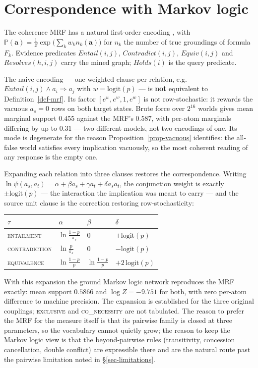 \documentclass{article} %
\newcommand{\pr}[1]{\mathbb{P}\!\left( #1 \right)}
\newcommand{\coupling}[1]{\textsc{#1}}          %
\begin{document}
\section{Correspondence with Markov logic}
\label{app-mln}

The coherence MRF has a natural first-order encoding \citep{mln}, with
$\pr{\mathbf{a}}=\tfrac1Z\exp\bigl(\sum_k w_k n_k(\mathbf{a})\bigr)$ for $n_k$ the number of
true groundings of formula $F_k$. Evidence predicates $\mathit{Entail}(i,j)$,
$\mathit{Contradict}(i,j)$, $\mathit{Equiv}(i,j)$ and $\mathit{Resolves}(h,i,j)$ carry the
mined graph; $\mathit{Holds}(i)$ is the query predicate.

The naive encoding --- one weighted clause per relation, e.g.\
$\mathit{Entail}(i,j)\wedge a_i \Rightarrow a_j$ with $w=\mathrm{logit}(p)$ --- is
\textbf{not} equivalent to Definition~\ref{def-mrf}. Its factor
$[e^w,e^w,1,e^w]$ is not row-stochastic: it rewards the vacuous $a_s=0$ rows on both target
states. Brute force over $2^{16}$ worlds gives mean marginal support $0.455$ against the
MRF's $0.587$, with per-atom marginals differing by up to $0.31$ --- two different models,
not two encodings of one. Its mode is degenerate for the reason
Proposition~\ref{prop-vacuous} identifies: the all-false world satisfies every implication
vacuously, so the most coherent reading of any response is the empty one.

Expanding each relation into three clauses restores the correspondence. Writing
$\ln\psi(a_s,a_t)=\alpha+\beta a_s+\gamma a_t+\delta a_s a_t$, the conjunction weight is
exactly $\pm\mathrm{logit}(p)$ --- the interaction the implication was meant to carry --- and
the source unit clause is the correction restoring row-stochasticity:
\begin{center}\small
\begin{tabular}{@{}llll@{}}
\toprule
$\tau$ & $\alpha$ & $\beta$ & $\delta$ \\
\midrule
\coupling{entailment}    & $\ln\frac{1-p}{\pi_s}$ & $0$ & $+\mathrm{logit}(p)$ \\
\coupling{contradiction} & $\ln\frac{p}{\pi_s}$   & $0$ & $-\mathrm{logit}(p)$ \\
\coupling{equivalence}   & $\ln\frac{1-p}{p}$ & $\ln\frac{1-p}{p}$ & $+2\,\mathrm{logit}(p)$ \\
\bottomrule
\end{tabular}
\end{center}
With this expansion the ground Markov logic network reproduces the MRF exactly: mean support
$0.5866$ and $\log Z=-9.751$ for both, with zero per-atom difference to machine precision. The
expansion is established for the three original couplings; \coupling{exclusive} and
\coupling{co\_necessity} are not tabulated. The reason to prefer the MRF for the measure
itself is that its pairwise family is closed at three parameters, so the vocabulary cannot
quietly grow; the reason to keep the Markov logic view is that the beyond-pairwise rules
(transitivity, concession cancellation, double conflict) are expressible there and are the
natural route past the pairwise limitation noted in \S\ref{sec-limitations}.
\end{document}
